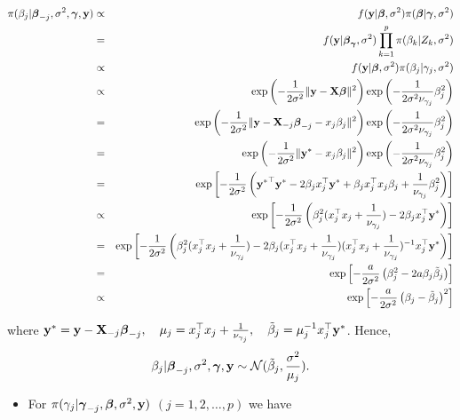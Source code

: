 \documentclass[]{book}
\providecommand{\tightlist}{%
  \setlength{\itemsep}{0pt}\setlength{\parskip}{0pt}}
\begin{document}
\begin{eqnarray*}
\pi(\beta_j|{\boldsymbol \beta}_{-j}, \sigma^2, {\boldsymbol \gamma}, {\bf y})&\propto&f({\bf y}|{\boldsymbol \beta}, \sigma^2)\pi({\boldsymbol \beta}|{\boldsymbol \gamma}, \sigma^2)\\
&=&f({\bf y}|{\boldsymbol \beta}_{{\boldsymbol \gamma}}, \sigma^2) \prod_{k=1}^{p}\pi(\beta_k|Z_k, \sigma^2)\\
&\propto&f({\bf y}|{\boldsymbol \beta}, \sigma^2)\pi(\beta_j|\gamma_j, \sigma^2)\\
&\propto& \exp\left(-\frac{1}{2\sigma^2}\|{\bf y}-{\bf X}{\boldsymbol \beta}\|^2 \right)
\exp\left(-\frac{1}{2\sigma^2\nu_{\gamma_j}}\beta_j^2\right)\\
&=& \exp\left(-\frac{1}{2\sigma^2}\|{\bf y}- {\bf X}_{-j}{\boldsymbol \beta}_{-j} - x_j \beta_j\|^2\right)
\exp\left(-\frac{1}{2\sigma^2\nu_{\gamma_j}}\beta_j^2\right)\\
&=& \exp\left(-\frac{1}{2\sigma^2}\|{\bf y}^* - x_j \beta_j\|^2\right)
\exp\left(-\frac{1}{2\sigma^2\nu_{\gamma_j}}\beta_j^2\right)\\
&=&\exp\left[-\frac{1}{2\sigma^2}\left({{\bf y}^*}^{{\top}}{\bf y}^* - 2\beta_j x_j^{{\top}}{\bf y}^*
+ \beta_j x_j^{{\top}}x_j\beta_j + \frac{1}{\nu_{\gamma_j}}\beta_j^2\right)\right]\\
&\propto&\exp\left[-\frac{1}{2\sigma^2}\left(\beta_j^2(x_j^{{\top}}x_j +
\frac{1}{\nu_{\gamma_j}}) - 2\beta_j x_j^{{\top}}{\bf y}^* \right)\right]\\
&=&\exp\left[-\frac{1}{2\sigma^2}\left(\beta_j^2(x_j^{{\top}}x_j +
\frac{1}{\nu_{\gamma_j}}) - 2\beta_j (x_j^{{\top}}x_j + \frac{1}{\nu_{\gamma_j}})(x_j^{{\top}}x_j +
\frac{1}{\nu_{\gamma_j}})^{-1} x_j^{{\top}}{\bf y}^* \right)\right]\\
&=& \exp\left[-\frac{a}{2\sigma^2}\left(\beta_j^2 - 2a \beta_j \tilde \beta_j\right)\right]\\
&\propto& \exp\left[-\frac{a}{2\sigma^2}\left(\beta_j -\tilde \beta_j\right)^2\right]\\
\end{eqnarray*}

where \({\bf y}^* = {\bf y}- {\bf X}_{-j}{\boldsymbol \beta}_{-j}, \quad \mu_j= x_j^{{\top}}x_j + \frac{1}{\nu_{\gamma_j}},\quad \tilde \beta_j = \mu_j^{-1}x_j^{{\top}}{\bf y}^*\).
Hence, \[\beta_j|{\boldsymbol \beta}_{-j}, \sigma^2, {\boldsymbol \gamma}, {\bf y}\sim \mathcal{N}(\tilde \beta_j, \frac{\sigma^2}{\mu_j}).\]

\begin{itemize}
\tightlist
\item
  For \(\pi(\gamma_j|{\boldsymbol \gamma}_{-j}, {\boldsymbol \beta}, \sigma^2, {\bf y})\) \((j = 1,2, \ldots,p)\) we have
\end{itemize}
\end{document}
